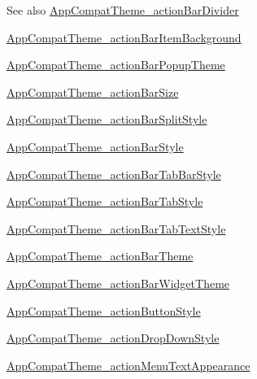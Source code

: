 \begin{DoxySeeAlso}{See also}
\hyperlink{classandroid_1_1support_1_1design_1_1R_1_1styleable_a114c1b92963957310f5ba215a1c81a77}{App\+Compat\+Theme\+\_\+action\+Bar\+Divider} 

\hyperlink{classandroid_1_1support_1_1design_1_1R_1_1styleable_af6c020b0e1ecf70811c2d81f3d06d55b}{App\+Compat\+Theme\+\_\+action\+Bar\+Item\+Background} 

\hyperlink{classandroid_1_1support_1_1design_1_1R_1_1styleable_abe6573d781c288c0c9046d1b364bc010}{App\+Compat\+Theme\+\_\+action\+Bar\+Popup\+Theme} 

\hyperlink{classandroid_1_1support_1_1design_1_1R_1_1styleable_aa3e26576191105ff3f5ba8a1d92c188f}{App\+Compat\+Theme\+\_\+action\+Bar\+Size} 

\hyperlink{classandroid_1_1support_1_1design_1_1R_1_1styleable_a1bb68b5f66ea4a588bc4527379e17f79}{App\+Compat\+Theme\+\_\+action\+Bar\+Split\+Style} 

\hyperlink{classandroid_1_1support_1_1design_1_1R_1_1styleable_a762be5b610718b70a3cf442d4599d870}{App\+Compat\+Theme\+\_\+action\+Bar\+Style} 

\hyperlink{classandroid_1_1support_1_1design_1_1R_1_1styleable_ab0c563d507ebb2630a4566f31cf6f123}{App\+Compat\+Theme\+\_\+action\+Bar\+Tab\+Bar\+Style} 

\hyperlink{classandroid_1_1support_1_1design_1_1R_1_1styleable_a1347569d26ea3874ad7e4895dd851764}{App\+Compat\+Theme\+\_\+action\+Bar\+Tab\+Style} 

\hyperlink{classandroid_1_1support_1_1design_1_1R_1_1styleable_afd214b041105e6d734d0bcb07952db44}{App\+Compat\+Theme\+\_\+action\+Bar\+Tab\+Text\+Style} 

\hyperlink{classandroid_1_1support_1_1design_1_1R_1_1styleable_a546d385fc73621e6d2b4a7651393cf97}{App\+Compat\+Theme\+\_\+action\+Bar\+Theme} 

\hyperlink{classandroid_1_1support_1_1design_1_1R_1_1styleable_aa29dc2ceab71fce65a98112d59814cc4}{App\+Compat\+Theme\+\_\+action\+Bar\+Widget\+Theme} 

\hyperlink{classandroid_1_1support_1_1design_1_1R_1_1styleable_a7624e37d8aabda6278719ae78bd6ceac}{App\+Compat\+Theme\+\_\+action\+Button\+Style} 

\hyperlink{classandroid_1_1support_1_1design_1_1R_1_1styleable_a957bedc8ddafbc2bad20cfbde1be90c8}{App\+Compat\+Theme\+\_\+action\+Drop\+Down\+Style} 

\hyperlink{classandroid_1_1support_1_1design_1_1R_1_1styleable_a79a449d47565fce4e42e3450e3f6a326}{App\+Compat\+Theme\+\_\+action\+Menu\+Text\+Appearance} 


\end{DoxySeeAlso}
